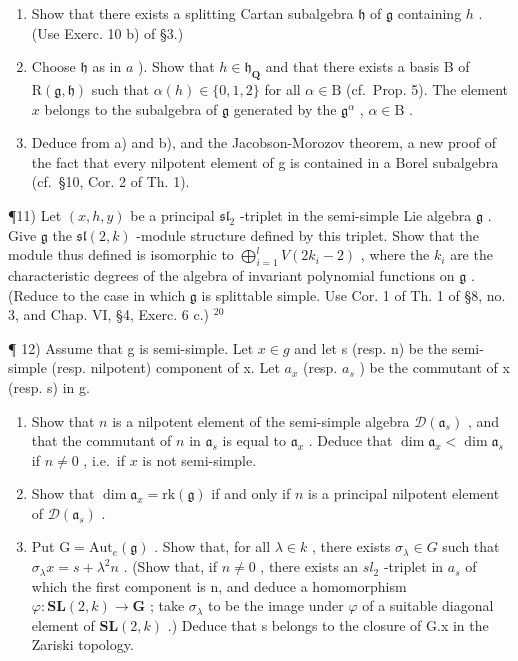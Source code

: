 \begin{enumerate}
\def\labelenumi{\alph{enumi})}
\item
  Show that there exists a splitting Cartan subalgebra \(\mathfrak{h}\) of \(\mathfrak{g}\) containing \(h\) . (Use Exerc. 10 b) of §3.)
\item
  Choose \(\mathfrak{h}\) as in \(a\) ). Show that \(h \in \mathfrak{h}_{\mathbf{Q}}\) and that there exists a basis B of \(\mathrm{R}(\mathfrak{g}, \mathfrak{h})\) such that \(\alpha(h) \in \{0, 1, 2\}\) for all \(\alpha \in \mathrm{B}\) (cf.~Prop. 5). The element \(x\) belongs to the subalgebra of \(\mathfrak{g}\) generated by the \(\mathfrak{g}^{\alpha}\) , \(\alpha \in \mathrm{B}\) .
\item
  Deduce from a) and b), and the Jacobson-Morozov theorem, a new proof of the fact that every nilpotent element of g is contained in a Borel subalgebra (cf.~§10, Cor. 2 of Th. 1).
\end{enumerate}

¶11) Let \((x,h,y)\) be a principal \(\mathfrak{sl}_2\) -triplet in the semi-simple Lie algebra \(\mathfrak{g}\) . Give \(\mathfrak{g}\) the \(\mathfrak{sl}(2,k)\) -module structure defined by this triplet. Show that the module thus defined is isomorphic to \(\bigoplus_{i=1}^{l} V(2k_i - 2)\) , where the \(k_i\) are the characteristic degrees of the algebra of invariant polynomial functions on \(\mathfrak{g}\) . (Reduce to the case in which \(\mathfrak{g}\) is splittable simple. Use Cor. 1 of Th. 1 of §8, no. 3, and Chap. VI, §4, Exerc. 6 c.) \(^{20}\)

¶ 12) Assume that g is semi-simple. Let \(x \in g\) and let s (resp. n) be the semi-simple (resp. nilpotent) component of x. Let \(a_{x}\) (resp. \(a_{s}\) ) be the commutant of x (resp. s) in g.

\begin{enumerate}
\def\labelenumi{\alph{enumi})}
\item
  Show that \(n\) is a nilpotent element of the semi-simple algebra \(\mathcal{D}(\mathfrak{a}_s)\) , and that the commutant of \(n\) in \(\mathfrak{a}_s\) is equal to \(\mathfrak{a}_x\) . Deduce that \(\dim \mathfrak{a}_x < \dim \mathfrak{a}_s\) if \(n \neq 0\) , i.e.~if \(x\) is not semi-simple.
\item
  Show that \(\dim \mathfrak{a}_x = \mathrm{rk}(\mathfrak{g})\) if and only if \(n\) is a principal nilpotent element of \(\mathcal{D}(\mathfrak{a}_s)\) .
\item
  Put \(\mathrm{G} = \mathrm{Aut}_{e}(\mathfrak{g})\) . Show that, for all \(\lambda \in k\) , there exists \(\sigma_{\lambda} \in G\) such that \(\sigma_{\lambda}x = s + \lambda^{2}n\) . (Show that, if \(n \neq 0\) , there exists an \(sl_{2}\) -triplet in \(a_{s}\) of which the first component is n, and deduce a homomorphism \(\varphi : \mathbf{SL}(2, k) \to \mathbf{G}\) ; take \(\sigma_{\lambda}\) to be the image under \(\varphi\) of a suitable diagonal element of \(\mathbf{SL}(2, k)\) .) Deduce that s belongs to the closure of G.x in the Zariski topology.
\end{enumerate}

